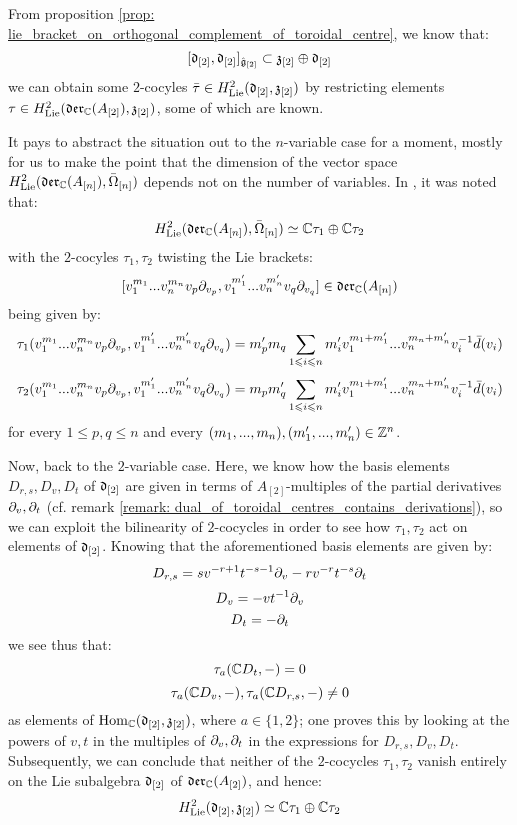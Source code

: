         \begin{remark}
            From proposition \ref{prop: lie_bracket_on_orthogonal_complement_of_toroidal_centre}, we know that:
                $$[\mathfrak{d}_{[2]}, \mathfrak{d}_{[2]}]_{\hat{\mathfrak{g}}_{[2]}} \subset \mathfrak{z}_{[2]} \oplus \mathfrak{d}_{[2]}$$
            we can obtain some $2$-cocyles $\bar{\tau} \in H^2_{\mathrm{Lie}}(\mathfrak{d}_{[2]}, \mathfrak{z}_{[2]})$ by restricting elements $\tau \in H^2_{\mathrm{Lie}}(\mathfrak{der}_{\mathbb{C}}(A_{[2]}), \mathfrak{z}_{[2]})$, some of which are known.

            It pays to abstract the situation out to the $n$-variable case for a moment, mostly for us to make the point that the dimension of the vector space $H^2_{\mathrm{Lie}}(\mathfrak{der}_{\mathbb{C}}(A_{[n]}), \bar{\Omega}_{[n]})$ depends not on the number of variables. In \cite[pp. 5, below Equation 1.3]{billig_energy_momentum_tensor}, it was noted that:
                $$H^2_{\mathrm{Lie}}(\mathfrak{der}_{\mathbb{C}}(A_{[n]}), \bar{\Omega}_{[n]}) \simeq \mathbb{C} \tau_1 \oplus \mathbb{C} \tau_2$$
            with the $2$-cocyles $\tau_1, \tau_2$ twisting the Lie brackets:
                $$[v_1^{m_1} ... v_n^{m_n} v_p \partial_{v_p}, v_1^{m'_1} ... v_n^{m'_n} v_q \partial_{v_q}] \in \mathfrak{der}_{\mathbb{C}}(A_{[n]})$$
            being given by:
                $$\tau_1(v_1^{m_1} ... v_n^{m_n} v_p \partial_{v_p}, v_1^{m'_1} ... v_n^{m'_n} v_q \partial_{v_q}) = m'_p m_q \sum_{1 \leqslant i \leqslant n} m'_i v_1^{m_1 + m'_1} ... v_n^{m_n + m'_n} v_i^{-1} \bar{d}(v_i)$$
                $$\tau_2(v_1^{m_1} ... v_n^{m_n} v_p \partial_{v_p}, v_1^{m'_1} ... v_n^{m'_n} v_q \partial_{v_q}) = m_p m'_q \sum_{1 \leqslant i \leqslant n} m'_i v_1^{m_1 + m'_1} ... v_n^{m_n + m'_n} v_i^{-1} \bar{d}(v_i)$$
            for every $1 \leq p, q \leq n$ and every $(m_1, ..., m_n), (m'_1, ..., m'_n) \in \mathbb{Z}^n$. 

            Now, back to the $2$-variable case. Here, we know how the basis elements $D_{r, s}, D_v, D_t$ of $\mathfrak{d}_{[2]}$ are given in terms of $A_{[2]}$-multiples of the partial derivatives $\partial_v, \partial_t$ (cf. remark \ref{remark: dual_of_toroidal_centres_contains_derivations}), so we can exploit the bilinearity of $2$-cocycles in order to see how $\tau_1, \tau_2$ act on elements of $\mathfrak{d}_{[2]}$. Knowing that the aforementioned basis elements are given by:
                $$D_{r, s} = s v^{-r + 1} t^{-s - 1} \partial_v - r v^{-r} t^{-s} \partial_t$$
                $$D_v = -v t^{-1} \partial_v$$
                $$D_t = -\partial_t$$
            we see thus that:
                $$\tau_a(\mathbb{C} D_t, -) = 0$$
                $$\tau_a(\mathbb{C} D_v, -), \tau_a(\mathbb{C} D_{r, s}, -) \not = 0$$
            as elements of $\mathrm{Hom}_{\mathbb{C}}(\mathfrak{d}_{[2]}, \mathfrak{z}_{[2]})$, where $a \in \{1, 2\}$; one proves this by looking at the powers of $v, t$ in the multiples of $\partial_v, \partial_t$ in the expressions for $D_{r, s}, D_v, D_t$. Subsequently, we can conclude that neither of the $2$-cocycles $\tau_1, \tau_2$ vanish entirely on the Lie subalgebra $\mathfrak{d}_{[2]}$ of $\mathfrak{der}_{\mathbb{C}}(A_{[2]})$, and hence:
                $$H^2_{\mathrm{Lie}}(\mathfrak{d}_{[2]}, \mathfrak{z}_{[2]}) \simeq \mathbb{C} \tau_1 \oplus \mathbb{C} \tau_2$$
        \end{remark}
